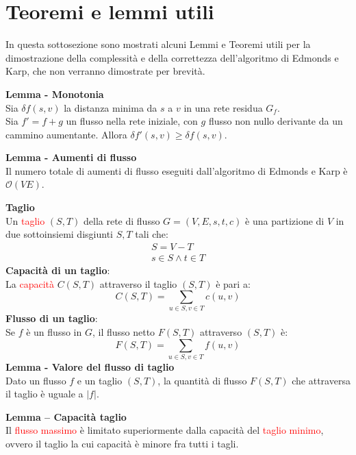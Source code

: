 \documentclass[../cheatSheetAlgoritmi.tex]{subfiles}
\begin{document}
\section{Teoremi e lemmi utili}
In questa sottosezione sono mostrati alcuni Lemmi e Teoremi utili per la dimostrazione della complessità e della correttezza dell'algoritmo di Edmonds e Karp, che non verranno dimostrate per brevità.

\bigskip
\textbf{Lemma - Monotonia} \\
Sia $\delta f(s,v)$ la distanza minima da $s$ a $v$ in una rete residua $G_f$. \\Sia $f'=f+g$ un flusso nella rete iniziale, con $g$ flusso non nullo derivante da un cammino aumentante. Allora $\delta f'(s,v)\geq \delta f(s,v)$.

\bigskip
\textbf{Lemma - Aumenti di flusso} \\
Il numero totale di aumenti di flusso eseguiti dall'algoritmo di Edmonds e Karp è $\mathcal{O}(V E)$.

\bigskip
\textbf{Taglio} \\
Un \textcolor{red}{taglio} $(S,T)$ della rete di flusso $G= (V, E, s, t, c)$ è una partizione di $V$ in due sottoinsiemi disgiunti $S, T$ tali che: 
\begin{align*}
  	S = V - T \\
  	s \in S \land t \in T
\end{align*}
\textbf{Capacità di un taglio}: \\
La \textcolor{red}{capacità} $C(S, T)$ attraverso il taglio $(S,T)$ è pari a:
\begin{equation*}
  	C(S, T) = \sum_{u \in S, v \in T} c(u, v)
\end{equation*}
\textbf{Flusso di un taglio}: \\
Se $f$ è un flusso in $G$, il flusso netto $F(S,T)$ attraverso $(S,T)$ è: 
\begin{equation*}
  	F(S,T) = \sum_{u \in S, v \in T}f(u,v)
\end{equation*}
\textbf{Lemma - Valore del flusso di taglio} \\
Dato un flusso $f$ e un taglio $(S,T)$, la quantità di flusso $F(S,T)$ che attraversa il taglio è uguale a $|f|$. 

\bigskip
\textbf{Lemma – Capacità taglio} \\
Il \textcolor{red}{flusso massimo} è limitato superiormente dalla capacità del \textcolor{red}{taglio minimo}, ovvero il taglio la cui capacità è minore fra tutti i tagli.
\end{document}
